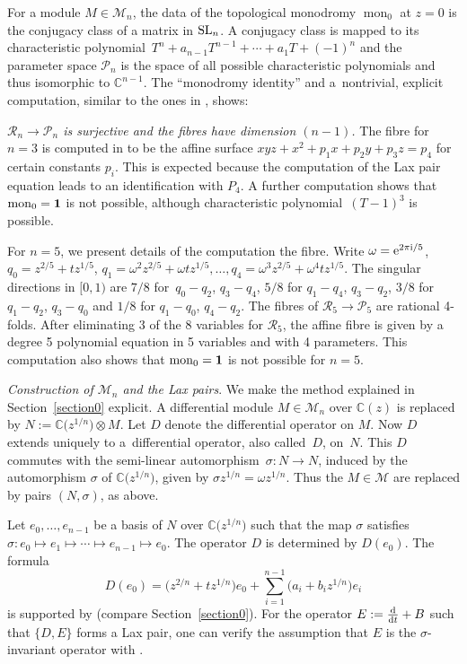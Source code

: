 \documentclass[pdftex]{sigma}
\numberwithin{equation}{section}
\begin{document}
For a module $M\in \mathcal{M}_n$, the data of the topological monodromy $\operatorname{mon}_0$ at $z=0$ is the conjugacy class of a matrix in ${\rm SL}_n$.
A conjugacy class is mapped to its characteristic polynomial~${T^n+a_{n-1}T^{n-1}+\cdots +a_1T+(-1)^n}$ and the parameter space
$\mathcal{P}_n$ is the space of all possible characteristic polynomials and thus isomorphic to $\mathbb{C}^{n-1}$.
The ``monodromy identity'' and a~nontrivial, explicit computation, similar to the ones in \cite{CM-vdP}, shows:

{\it $\mathcal{R}_n\rightarrow \mathcal{P}_n$ is surjective and the fibres have dimension $(n-1)$.}
 The fibre for $n=3$ is computed in \cite{vdP-T} to be the affine surface $xyz+x^2+p_1x+p_2y+p_3z=p_4$ for certain constants $p_i$.
 This is expected because the computation of the Lax pair equation leads to an identification with $P_4$.
 A further computation shows that $\operatorname{mon}_0={\bf 1}$ is not possible, although characteristic polynomial~${(T-1)^3}$ is possible.

 For $n=5$, we present details of the computation the fibre. Write
 $\omega ={\rm e}^{2\pi {\rm i}/5}$, $q_0=z^{2/5}+tz^{1/5}$,
 $q_1=\omega^2z^{2/5}+\omega t z^{1/5}, \dots , q_4=\omega^3z^{2/5}+\omega^4tz^{1/5}$.
 The singular directions in $[0,1)$ are $7/8$ for~${q_0-q_2}$, $ q_3-q_4$, $5/8$ for $q_1-q_4$, $ q_3-q_2$, $3/8$ for $q_1-q_2$, $ q_3-q_0$ and
 $1/8$ for $q_1-q_0$, $ q_4-q_2$. The fibres of $\mathcal{R}_5\rightarrow \mathcal{P}_5$ are rational 4-folds. After eliminating 3 of the 8
 variables for $\mathcal{R}_5$, the affine fibre is given by a degree 5 polynomial equation in 5 variables and with 4 parameters.
This computation also shows that $\operatorname{mon}_0={\bf 1}$ is not possible for $n=5$.

{\it Construction of $\mathcal{M}_n$ and the Lax pairs}.
We make the method explained in Section~\ref{section0} explicit. A differential module
$M\in \mathcal{M}_n$ over $\mathbb{C}(z)$ is replaced by $N:=\mathbb{C}\bigl(z^{1/n}\bigr)\otimes M$. Let $D$ denote the differential operator
 on $M$. Now $D$ extends uniquely to a~differential operator, also called~$D$, on~$N$. This $D$ commutes
with the semi-linear automorphism~${\sigma\colon N\rightarrow N}$, induced by the automorphism $\sigma$ of $\mathbb{C}\bigl(z^{1/n}\bigr)$, given by
$\sigma z^{1/n}=\omega z^{1/n}$. Thus the $M\in \mathcal{M}$ are replaced by pairs $(N,\sigma)$, as above.


 Let $e_0,\dots ,e_{n-1}$ be a basis of $N$ over $\mathbb{C}\bigl(z^{1/n}\bigr)$ such that the map $\sigma$
 satisfies $\sigma \colon e_0\mapsto e_1\mapsto \cdots \mapsto e_{n-1}\mapsto e_0$. The operator $D$ is determined by
 $D(e_0)$. The formula
 \[
 D(e_0)=\bigl(z^{2/n}+tz^{1/n}\bigr)e_0+\sum _{i=1}^{n-1}\bigl(a_i+b_iz^{1/n}\bigr)e_i
 \]
 is supported by \cite[Sections~12.3--12.5]{vdP-Si} (compare Section~\ref{section0}).
 For the operator $E:=\frac{{\rm d}}{{\rm d}t}+B$ such that $\{D, E\}$ forms a Lax pair, one can verify the assumption that $E$
is the $\sigma$-invariant operator with .
\end{document}
